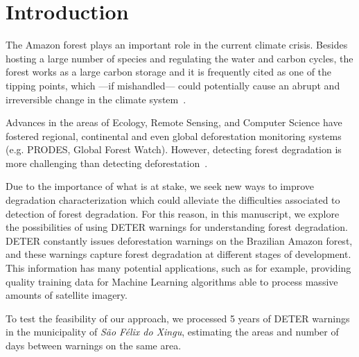 \section{Introduction}

The Amazon forest plays an important role in the current climate crisis.
Besides hosting a large number of species and regulating the water and carbon 
cycles, the forest works as a large carbon storage and it is frequently cited  
as one of the tipping points, which ---if mishandled--- could potentially cause 
an abrupt and irreversible change in the climate 
system~\cite{rockstrom2009,armstrong2022}.

Advances in the areas of Ecology, Remote Sensing, and Computer Science have
fostered regional, continental and even global deforestation
monitoring systems (e.g. PRODES, Global Forest Watch).
However, detecting forest degradation is more challenging than detecting
deforestation~\cite{lambin1999,mitchell2017}.

Due to the importance of what is at stake, we seek new ways to improve 
degradation characterization which could alleviate the difficulties 
associated to detection of forest degradation.
For this reason, in this manuscript, we explore the possibilities of using 
DETER warnings for understanding forest degradation.
DETER constantly issues deforestation warnings on the Brazilian Amazon forest, 
and these warnings capture forest degradation at different stages of
development.
This information has many potential applications, such as for example, 
providing quality training data for Machine Learning algorithms able to process 
massive amounts of satellite imagery.

To test the feasibility of our approach, we processed 5 years of DETER 
warnings in the municipality of \textit{São Félix do Xingu}, estimating the 
areas and number of days between warnings on the same area.
